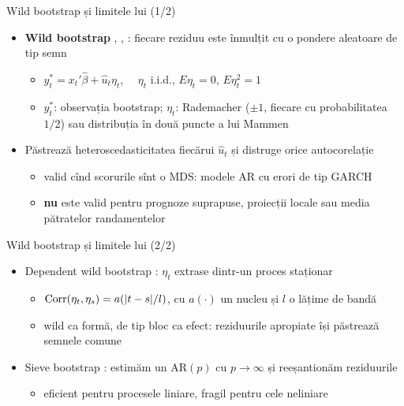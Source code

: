 \begin{frame}{Wild bootstrap și limitele lui (1/2)}
\itemsize{\small}
\begin{itemize}
    \item \textbf{Wild bootstrap} , , : fiecare reziduu este înmulțit cu o pondere aleatoare de tip semn
    \begin{itemize}
        \item $y_t^* = x_t'\hat\beta + \hat u_t\eta_t$, $\quad \eta_t$ i.i.d., $E\eta_t = 0$, $E\eta_t^2 = 1$
        \item $y_t^*$: observația bootstrap; $\eta_t$: Rademacher ($\pm 1$, fiecare cu probabilitatea $1/2$) sau distribuția în două puncte a lui Mammen
    \end{itemize}
    \item Păstrează heteroscedasticitatea fiecărui $\hat u_t$ și distruge orice autocorelație
    \begin{itemize}
        \item valid cînd scorurile sînt o MDS: modele AR cu erori de tip GARCH 
        \item \textbf{nu} este valid pentru prognoze suprapuse, proiecții locale sau media pătratelor randamentelor
    \end{itemize}
\end{itemize}
\end{frame}

\begin{frame}{Wild bootstrap și limitele lui (2/2)}
\itemsize{\small}
\begin{itemize}
    \item Dependent wild bootstrap : $\eta_t$ extrase dintr-un proces staționar
    \begin{itemize}
        \item $\text{Corr}(\eta_t, \eta_s) = a(|t-s|/l)$, cu $a(\cdot)$ un nucleu și $l$ o lățime de bandă
        \item wild ca formă, de tip bloc ca efect: reziduurile apropiate își păstrează semnele comune
    \end{itemize}
    \item Sieve bootstrap : estimăm un AR$(p)$ cu $p \to \infty$ și reeșantionăm reziduurile
    \begin{itemize}
        \item eficient pentru procesele liniare, fragil pentru cele neliniare
    \end{itemize}
\end{itemize}
\end{frame}

